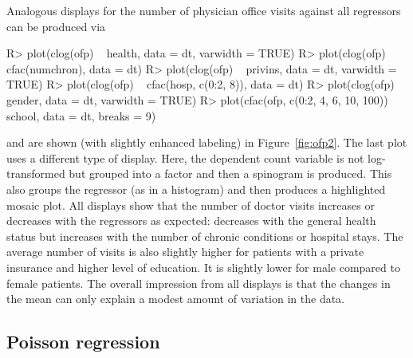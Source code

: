 \documentclass{Z}
\begin{document}
Analogous displays for the number of physician office visits against all regressors
can be produced via
\begin{Schunk}
\begin{Sinput}
R> plot(clog(ofp) ~ health, data = dt, varwidth = TRUE)
R> plot(clog(ofp) ~ cfac(numchron), data = dt)
R> plot(clog(ofp) ~ privins, data = dt, varwidth = TRUE)
R> plot(clog(ofp) ~ cfac(hosp, c(0:2, 8)), data = dt)
R> plot(clog(ofp) ~ gender, data = dt, varwidth = TRUE)
R> plot(cfac(ofp, c(0:2, 4, 6, 10, 100)) ~ school, data = dt, breaks = 9)
\end{Sinput}
\end{Schunk}
and are shown (with slightly enhanced labeling) in Figure~\ref{fig:ofp2}. 
The last plot uses a different type of display. Here, the dependent count variable
is not log-transformed but grouped into a factor and then a spinogram
is produced. This also groups the regressor (as in a histogram) and then
produces a highlighted mosaic plot. All displays show that the number of
doctor visits increases or decreases with the regressors as expected: 
decreases with the general health status but increases with the number of
chronic conditions or hospital stays. The average number of visits is also
slightly higher for patients with a private insurance and higher level of 
education. It is slightly lower for male compared to female patients.
The overall impression from all displays is that the changes in the mean
can only explain a modest amount of variation in the data.


\subsection{Poisson regression}
\end{document}
